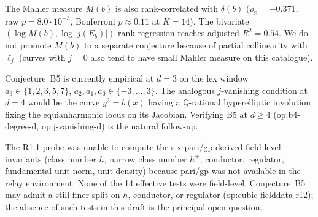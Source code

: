 \begin{remark}
The Mahler measure $M(b)$ is also rank-correlated with $\delta(b)$
($\rho_{\mathrm{S}} = -0.371$, raw $p = 8.0 \cdot 10^{-3}$,
Bonferroni $p \approx 0.11$ at $K = 14$). The bivariate
$(\log M(b), \log|j(E_b)|)$ rank-regression reaches adjusted
$R^2 = 0.54$. We do not promote $M(b)$ to a separate conjecture
because of partial collinearity with $\ell_j$ (curves with $j = 0$
also tend to have small Mahler measure on this catalogue).
\end{remark}

\begin{remark}
Conjecture~B5 is currently empirical at $d = 3$ on the lex window
$a_3 \in \{1,2,3,5,7\}$, $a_2, a_1, a_0 \in \{-3,\ldots,3\}$. The
analogous $j$-vanishing condition at $d = 4$ would be the curve
$y^2 = b(x)$ having a $\mathbb{Q}$-rational hyperelliptic involution
fixing the equianharmonic locus on its Jacobian. Verifying B5 at
$d \ge 4$ (op:b4-degree-d, op:j-vanishing-d) is the natural
follow-up.
\end{remark}

\begin{remark}
The R1.1 probe was unable to compute the six pari/gp-derived
field-level invariants (class number $h$, narrow class number
$h^+$, conductor, regulator, fundamental-unit norm, unit density)
because pari/gp was not available in the relay environment. None
of the 14 effective tests were field-level. Conjecture~B5 may admit
a still-finer split on $h$, conductor, or regulator
(op:cubic-fielddata-r12); the absence of such tests in this draft
is the principal open question.
\end{remark}
